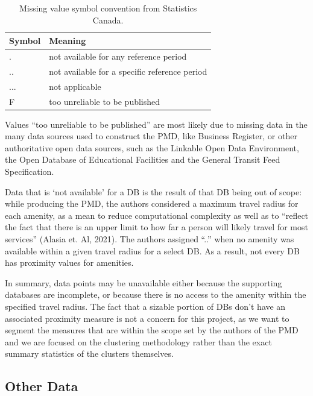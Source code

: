 \documentclass[11pt, a4paper]{article}
\begin{document}
\begin{table}[H]
\centering
\caption[Missing value symbols]{Missing value symbol convention from Statistics Canada.}\label{missingvalues}
\begin{tabular}{|l|l|}
\hline
\textbf{Symbol} & \textbf{Meaning} \\
\hline
. & not available for any reference period \\
\hline
.. & not available for a specific reference period \\
\hline
... & not applicable \\
\hline
F & too unreliable to be published \\
\hline
\end{tabular}
\end{table}




Values ``too unreliable to be published'' are most likely due to missing data in the many data sources used to construct the PMD, like Business Register, or other authoritative open data sources, such as the Linkable Open Data Environment, the Open Database of Educational Facilities and the General Transit Feed Specification.
\par
Data that is `not available' for a DB is the result of that DB being out of scope: while producing the PMD, the authors considered a maximum travel radius for each amenity, as a mean to reduce computational complexity as well as to ``reflect the fact that there is an upper limit to how far a person will likely travel for most services'' (Alasia et. Al, 2021). The authors assigned ``..'' when no amenity was available within a given travel radius for a select DB. As a result, not every DB has proximity values for amenities.
\par
In summary, data points may be unavailable either because the supporting databases are incomplete, or because there is no access to the amenity within the specified travel radius. The fact that a sizable portion of DBs don’t have an associated proximity measure is not a concern for this project, as we want to segment the measures that are within the scope set by the authors of the PMD and we are focused on the clustering methodology rather than the exact summary statistics of the clusters themselves.








\subsection{Other Data}
\end{document}
